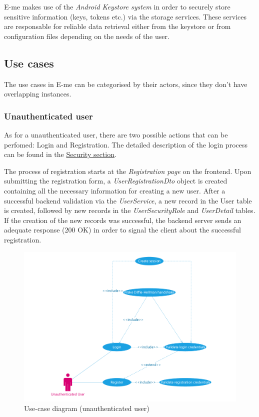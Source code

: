 E-me makes use of the \emph{Android Keystore system} in order to securely store sensitive information (keys, tokens etc.) via the storage services.
These services are responsable for reliable data retrieval either from the keystore or from configuration files depending on the needs of the user.

\subsection{Use cases}

The use cases in E-me can be categorised by their actors, since they don't have overlapping instances.

\subsubsection{Unauthenticated user}

As for a unauthenticated user, there are two possible actions that can be perfomed: Login and Registration.
The detailed description of the login process can be found in the \hyperref[end-to-end-encryption]{Security section}.

The process of registration starts at the \emph{Registration page} on the frontend.
Upon submitting the registration form, a \emph{UserRegistrationDto} object is created containing all the necessary information for creating a new user.
After a successful backend validation via the \emph{UserService}, a new record in the User table is created, followed by new records in the \emph{UserSecurityRole} and 
\emph{UserDetail} tables.
If the creation of the new records was successful, the backend server sends an adequate response (200 OK) in order to signal the client about the successful registration.

\begin{figure}[H]
	\centering
	\includegraphics[scale=0.52]{use-case-diagram-unauth}
	\caption{Use-case diagram (unauthenticated user)}
\end{figure}

